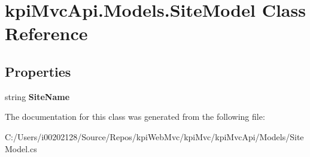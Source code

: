 \hypertarget{classkpi_mvc_api_1_1_models_1_1_site_model}{}\section{kpi\+Mvc\+Api.\+Models.\+Site\+Model Class Reference}
\label{classkpi_mvc_api_1_1_models_1_1_site_model}
\subsection*{Properties}
\begin{DoxyCompactItemize}
\item 
\mbox{\label{classkpi_mvc_api_1_1_models_1_1_site_model_ad22e76bab6da06a93974a0624baf3b01}} 
string {\bfseries Site\+Name}
\end{DoxyCompactItemize}


The documentation for this class was generated from the following file\+:\begin{DoxyCompactItemize}
\item 
C\+:/\+Users/i00202128/\+Source/\+Repos/kpi\+Web\+Mvc/kpi\+Mvc/kpi\+Mvc\+Api/\+Models/Site\+Model.\+cs\end{DoxyCompactItemize}
